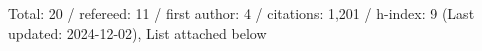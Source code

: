 Total: 20 / refereed: 11 / first author: 4 / citations: 1,201 / h-index: 9 (Last updated: 2024-12-02), List attached below